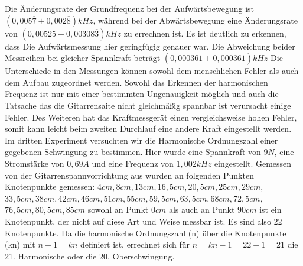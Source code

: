 \documentclass[11pt, a4Paper]{article}
\begin{document}
Die Änderungsrate der Grundfrequenz bei der Aufwärtsbewegung ist $(0,005\overline{7} \pm 0,002\overline{8})kHz$, während bei der Abwärtsbewegung eine Änderungsrate von $(0,00525
\pm 0,00308\overline{3})kHz$ zu errechnen ist. Es ist deutlich zu erkennen, dass Die Aufwärtsmessung hier geringfügig genauer war. Die Abweichung beider Messreihen bei gleicher Spannkraft beträgt $(0,00036\overline{1} \pm 0,00036\overline{1})kHz$ Die Unterschiede in den Messungen können sowohl dem menschlichen Fehler als auch dem Aufbau zugeordnet werden. Sowohl das Erkennen der harmonischen Frequenz ist nur mit einer bestimmten Ungenauigkeit möglich und auch die Tatsache das die Gitarrensaite nicht gleichmäßig spannbar ist verursacht einige Fehler. Des Weiteren hat das Kraftmessgerät einen vergleichsweise hohen Fehler, somit kann leicht beim zweiten Durchlauf eine andere Kraft eingestellt werden.\\
Im dritten Experiment versuchten wir die Harmonische Ordnungszahl einer gegebenen Schwingung zu bestimmen. Hier wurde eine Spannkraft von $9 N$, eine Stromstärke von $0,69A$ und eine Frequenz von $1,002 kHz$ eingestellt. Gemessen von der Gitarrenspannvorrichtung aus wurden an folgenden Punkten Knotenpunkte gemessen: $4cm, 8cm, 13cm, 16,5cm, 20,5cm, 25cm, 29cm,$\\$ 33,5cm, 38cm, 42cm, 46cm, 51cm, 55cm, 59,5cm, 63,5cm, 68cm, 72,5cm,$\\$ 76,5cm, 80,5cm, 85cm$ sowohl an Punkt $0cm$ als auch an Punkt $90cm$ ist ein Knotenpunkt, der nicht auf diese Art und Weise messbar ist. Es sind also 22 Knotenpunkte. Da die harmonische Ordnungszahl (n) über die Knotenpunkte (kn) mit $n+1=kn$ definiert ist, errechnet sich für $n=kn-1=22-1=21$ die 21. Harmonische oder die 20. Oberschwingung. 
 
\end{document}
